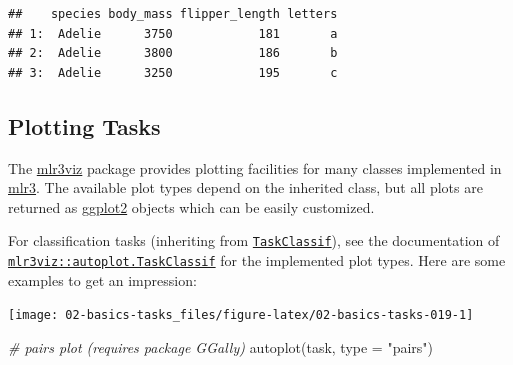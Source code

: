\documentclass[
]{scrbook}
\newenvironment{Shaded}{\begin{snugshade}}{\end{snugshade}}
\newcommand{\AttributeTok}[1]{\textcolor[rgb]{0.77,0.63,0.00}{#1}}
\newcommand{\CommentTok}[1]{\textcolor[rgb]{0.56,0.35,0.01}{\textit{#1}}}
\newcommand{\DecValTok}[1]{\textcolor[rgb]{0.00,0.00,0.81}{#1}}
\newcommand{\FunctionTok}[1]{\textcolor[rgb]{0.00,0.00,0.00}{#1}}
\newcommand{\NormalTok}[1]{#1}
\newcommand{\OtherTok}[1]{\textcolor[rgb]{0.56,0.35,0.01}{#1}}
\newcommand{\SpecialCharTok}[1]{\textcolor[rgb]{0.00,0.00,0.00}{#1}}
\newcommand{\StringTok}[1]{\textcolor[rgb]{0.31,0.60,0.02}{#1}}
\renewenvironment{Shaded} {\begin{snugshade}\small} {\end{snugshade}}
\begin{document}
\begin{verbatim}
##    species body_mass flipper_length letters
## 1:  Adelie      3750            181       a
## 2:  Adelie      3800            186       b
## 3:  Adelie      3250            195       c
\end{verbatim}

\hypertarget{autoplot-task}{%
\subsection{Plotting Tasks}\label{autoplot-task}}

The \href{https://mlr3viz.mlr-org.com}{mlr3viz} package provides plotting facilities for many classes implemented in \href{https://mlr3.mlr-org.com}{mlr3}.
The available plot types depend on the inherited class, but all plots are returned as \href{https://cran.r-project.org/package=ggplot2}{ggplot2} objects which can be easily customized.

For classification tasks (inheriting from \href{https://mlr3.mlr-org.com/reference/TaskClassif.html}{\texttt{TaskClassif}}), see the documentation of \href{https://mlr3viz.mlr-org.com/reference/autoplot.TaskClassif.html}{\texttt{mlr3viz::autoplot.TaskClassif}} for the implemented plot types.
Here are some examples to get an impression:

\begin{Shaded}
\end{Shaded}

\begin{center}\texttt{[image: 02-basics-tasks\_files/figure-latex/02-basics-tasks-019-1]} \end{center}

\begin{Shaded}
\begin{Highlighting}[]
\CommentTok{\# pairs plot (requires package GGally)}
\FunctionTok{autoplot}\NormalTok{(task, }\AttributeTok{type =} \StringTok{"pairs"}\NormalTok{)}
\end{Highlighting}
\end{Shaded}
\end{document}
